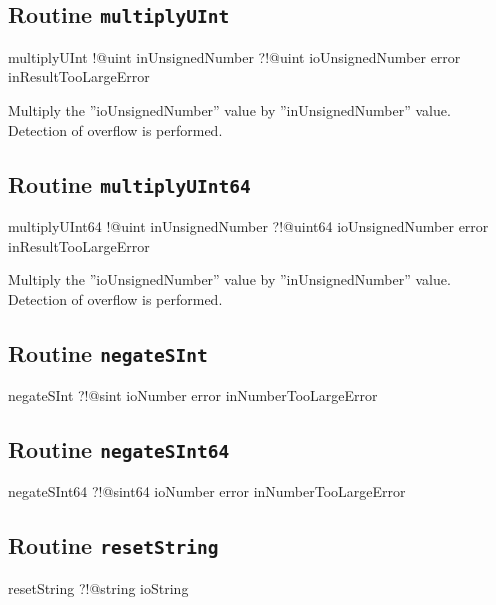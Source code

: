 \subsection{Routine \texttt{multiplyUInt}}

\begin{galgas3}
multiplyUInt !@uint inUnsignedNumber
             ?!@uint ioUnsignedNumber
             error inResultTooLargeError
\end{galgas3}

Multiply the ''ioUnsignedNumber'' value by ''inUnsignedNumber'' value. Detection of overflow is performed.

\subsection{Routine \texttt{multiplyUInt64}}

\begin{galgas3}
multiplyUInt64 !@uint inUnsignedNumber
               ?!@uint64 ioUnsignedNumber
               error inResultTooLargeError
\end{galgas3}

Multiply the ''ioUnsignedNumber'' value by ''inUnsignedNumber'' value. Detection of overflow is performed.

\subsection{Routine \texttt{negateSInt}}

\begin{galgas3}
negateSInt ?!@sint ioNumber
           error inNumberTooLargeError
\end{galgas3}

\subsection{Routine \texttt{negateSInt64}}

\begin{galgas3}
negateSInt64 ?!@sint64 ioNumber
             error inNumberTooLargeError
\end{galgas3}


\subsection{Routine \texttt{resetString}}

\begin{galgas3}
resetString ?!@string ioString
\end{galgas3}








